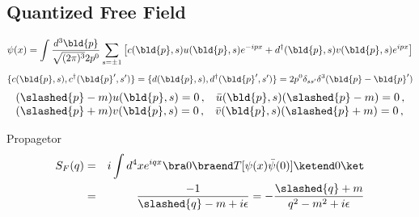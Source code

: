 \newpage 
\subsection{Quantized Free Field}
\begin{equation}
\psi(x) 
=
\int \frac{d^3 \bld{p}}{\sqrt{(2\pi)^3} 2 p^0}
\sum_{s = \pm 1}
\left[
c(\bld{p}, s) u(\bld{p}, s) e^{-ipx}
+
d^\dagger(\bld{p}, s) v(\bld{p}, s) e^{ipx}
\right]
\end{equation}
\begin{equation}
\{ c(\bld{p}, s), c^\dagger(\bld{p}', s') \}
=
\{ d(\bld{p}, s), d^\dagger(\bld{p}', s') \}
=
2p^0 \delta_{ss'}
\delta^3(\bld{p} - \bld{p}')
\end{equation}
\begin{equation}
\begin{array}{l}
(\slashed{p} - m) u(\bld{p}, s) = 0\,,
\hspace{3mm}
\bar{u}(\bld{p}, s)(\slashed{p} - m)  = 0\,,
\\
(\slashed{p} + m) v(\bld{p}, s) = 0\,,
\hspace{3mm}
\bar{v}(\bld{p}, s)(\slashed{p} + m)  = 0\,,
\end{array}
\end{equation}

Propagetor
\begin{eqnarray}
S_F(q) &=& i \int d^4x e^{iqx}
\bra 0 \braend T[\psi(x) \bar{\psi}(0)]
\ketend 0 \ket
\nonumber\\
&=&
\frac{-1}{\slashed{q} - m + i \epsilon}
=
- \frac{\slashed{q} + m}{ q^2 - m^2 + i \epsilon}
\label{eqn:DiracPropagator}
\end{eqnarray}

